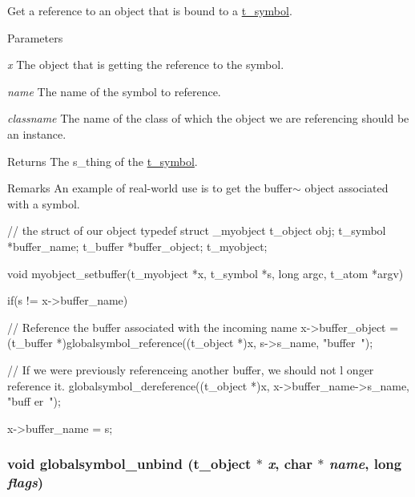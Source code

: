 Get a reference to an object that is bound to a \hyperlink{structt__symbol}{t\_\-symbol}. 
\begin{DoxyParams}{Parameters}
\item[{\em x}]The object that is getting the reference to the symbol. \item[{\em name}]The name of the symbol to reference. \item[{\em classname}]The name of the class of which the object we are referencing should be an instance. \end{DoxyParams}
\begin{DoxyReturn}{Returns}
The s\_\-thing of the \hyperlink{structt__symbol}{t\_\-symbol}.
\end{DoxyReturn}
\begin{DoxyRemark}{Remarks}
An example of real-\/world use is to get the buffer$\sim$ object associated with a symbol. 
\begin{DoxyCode}
    // the struct of our object
    typedef struct _myobject {
        t_object    obj;
        t_symbol    *buffer_name;
        t_buffer    *buffer_object;
    } t_myobject;
    
    void myobject_setbuffer(t_myobject *x, t_symbol *s, long argc, t_atom *argv)
    {       
        if(s != x->buffer_name){
            // Reference the buffer associated with the incoming name
            x->buffer_object = (t_buffer *)globalsymbol_reference((t_object *)x, 
      s->s_name, "buffer~");
            
            // If we were previously referenceing another buffer, we should not l
      onger reference it.
            globalsymbol_dereference((t_object *)x, x->buffer_name->s_name, "buff
      er~");
            
            x->buffer_name = s;
        }       
    }
\end{DoxyCode}
 
\end{DoxyRemark}
\hypertarget{group__misc_gade40c44fddc370895da5db8f70e1868f}{
\subsubsection[{globalsymbol\_\-unbind}]{\setlength{\rightskip}{0pt plus 5cm}void globalsymbol\_\-unbind ({\bf t\_\-object} $\ast$ {\em x}, \/  char $\ast$ {\em name}, \/  long {\em flags})}}
\label{group__misc_gade40c44fddc370895da5db8f70e1868f}


